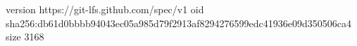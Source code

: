 version https://git-lfs.github.com/spec/v1
oid sha256:db61d0bbbb94043ec05a985d79f2913af8294276599edc41936e09d350506ca4
size 3168

